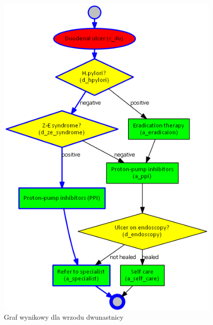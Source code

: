 \begin{figure}[H]
\centering
\includegraphics[scale=0.5]{img/rozwiazanie1du.png}
\caption{Graf wynikowy dla wrzodu dwunastnicy}
\label{fig:rozw_du}
\end{figure}
